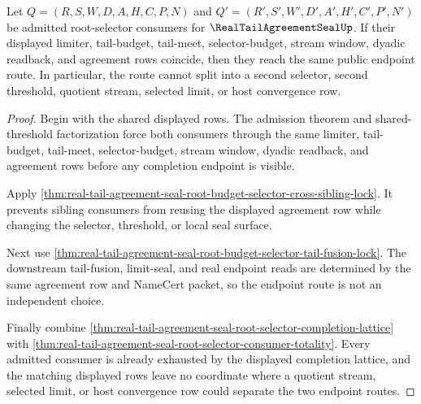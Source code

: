 \begin{theorem}
\label{thm:real-tail-agreement-seal-root-selector-endpoint-determinacy}
Let $Q=(R,S,W,D,A,H,C,P,N)$ and $Q'=(R',S',W',D',A',H',C',P',N')$ be admitted root-selector consumers for $\RealTailAgreementSealUp$. If their displayed limiter, tail-budget, tail-meet, selector-budget, stream window, dyadic readback, and agreement rows coincide, then they reach the same public endpoint route. In particular, the route cannot split into a second selector, second threshold, quotient stream, selected limit, or host convergence row.
\end{theorem}
\begin{proof}
Begin with the shared displayed rows. The admission theorem and shared-threshold factorization force both consumers through the same limiter, tail-budget, tail-meet, selector-budget, stream window, dyadic readback, and agreement rows before any completion endpoint is visible.

Apply \autoref{thm:real-tail-agreement-seal-root-budget-selector-cross-sibling-lock}. It prevents sibling consumers from reusing the displayed agreement row while changing the selector, threshold, or local seal surface.

Next use \autoref{thm:real-tail-agreement-seal-root-budget-selector-tail-fusion-lock}. The downstream tail-fusion, limit-seal, and real endpoint reads are determined by the same agreement row and NameCert packet, so the endpoint route is not an independent choice.

Finally combine \autoref{thm:real-tail-agreement-seal-root-selector-completion-lattice} with \autoref{thm:real-tail-agreement-seal-root-selector-consumer-totality}. Every admitted consumer is already exhausted by the displayed completion lattice, and the matching displayed rows leave no coordinate where a quotient stream, selected limit, or host convergence row could separate the two endpoint routes.
\end{proof}

